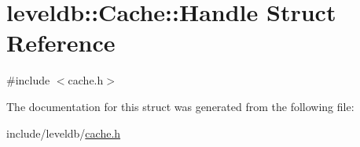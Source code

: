 \hypertarget{structleveldb_1_1_cache_1_1_handle}{\section{leveldb\-:\-:Cache\-:\-:Handle Struct Reference}
\label{structleveldb_1_1_cache_1_1_handle}
}


{\ttfamily \#include $<$cache.\-h$>$}



The documentation for this struct was generated from the following file\-:\begin{DoxyCompactItemize}
\item 
include/leveldb/\hyperlink{cache_8h}{cache.\-h}\end{DoxyCompactItemize}
